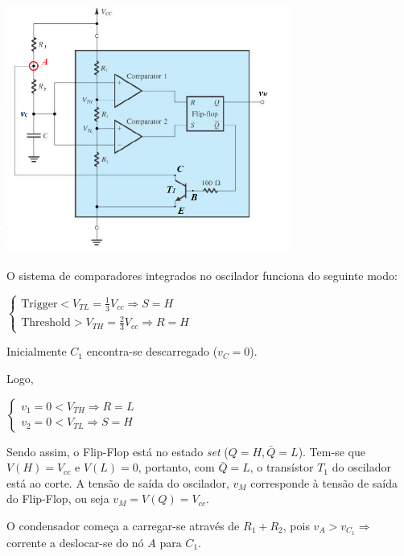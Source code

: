 \documentclass[a4paper,11pt]{report}
\begin{document}
    \begin{center}
    \includegraphics[angle=0,width=0.7\textwidth]{N.png}
    \label{fig:O}
    
    \end{center}


O sistema de comparadores integrados no oscilador funciona do seguinte modo:

\begin{center}
$
\begin{cases}
\text{Trigger}<V_{TL}=\frac{1}{3}V_{cc}\Rightarrow S=H\\
\text{Threshold}>V_{TH}=\frac{2}{3}V_{cc}\Rightarrow R=H
\end{cases}
$
\end{center}


Inicialmente $C_1$ encontra-se descarregado ($v_C=0$).

Logo,

\begin{center}
$
\begin{cases}
v_1=0<V_{TH}\Rightarrow R=L\\
v_2=0<V_{TL}\Rightarrow S=H
\end{cases}
$
\end{center}

Sendo assim, o Flip-Flop está no estado \textit{set} ($Q=H,\bar{Q}=L$). Tem-se que $V(H)=V_{cc}$ e $V(L)=0$, portanto, com $\bar{Q}=L$, o transístor $T_1$ do oscilador está ao corte. A tensão de saída do oscilador, $v_M$ corresponde à tensão de saída do Flip-Flop, ou seja $v_M=V(Q)=V_{cc}$.

O condensador começa a carregar-se através de $R_1+R_2$, pois $v_A>v_{C_1}\Rightarrow$ corrente a deslocar-se do nó $A$ para $C_1$.
\end{document}
